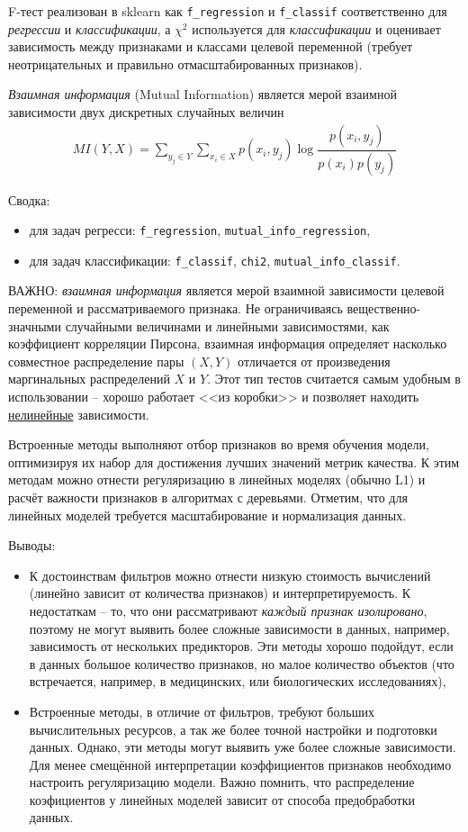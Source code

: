 \documentclass[%
	11pt,
	a4paper,
	utf8,
		]{article}
\begin{document}
F-тест реализован в sklearn как \texttt{f\_regression} и \texttt{f\_classif} соответственно для \emph{регрессии} и \emph{классификации}, а $ \chi^2 $ используется для \emph{классификации} и оценивает зависимость между признаками и классами целевой переменной (требует неотрицательных и правильно отмасштабированных признаков).

\emph{Взаимная информация} (Mutual Information) является мерой взаимной зависимости двух дискретных случайных величин
\begin{align*}
	MI(Y, X) = \sum_{y_j \in Y}\sum_{x_i \in X} p(x_i, y_j) \log \dfrac{p(x_i, y_j)}{p(x_i)p(y_j)}
\end{align*}

Сводка:
\begin{itemize}
	\item для задач регресси: \texttt{f\_regression}, \texttt{mutual\_info\_regression},
	
	\item для задач классификации: \texttt{f\_classif}, \texttt{chi2}, \texttt{mutual\_info\_classif}.
\end{itemize}

ВАЖНО: \emph{взаимная информация} является мерой взаимной зависимости целевой переменной и рассматриваемого признака. Не ограничиваясь вещественно-значными случайными величинами и линейными зависимостями, как коэффициент корреляции Пирсона, взаимная информация определяет насколько совместное распределение пары $ (X, Y) $ отличается от произведения маргинальных распределений $ X $ и $ Y $. Этот тип тестов считается самым удобным в использовании -- хорошо работает <<из коробки>> и позволяет находить \underline{нелинейные} зависимости.

Встроенные методы выполняют отбор признаков во время обучения модели, оптимизируя их набор для достижения лучших значений метрик качества. К этим методам можно отнести регуляризацию в линейных моделях (обычно L1) и расчёт важности признаков в алгоритмах с деревьями. Отметим, что для линейных моделей требуется масштабирование и нормализация данных.

Выводы:
\begin{itemize}
	\item К достоинствам фильтров можно отнести низкую стоимость вычислений (линейно зависит от количества признаков) и интерпретируемость. К недостаткам -- то, что они рассматривают \emph{каждый признак изолировано}, поэтому не могут выявить более сложные зависимости в данных, например, зависимость от нескольких предикторов. Эти методы хорошо подойдут, если в данных большое количество признаков, но малое количество объектов (что встречается, например, в медицинских, или биологических исследованиях),
	
	\item Встроенные методы, в отличие от фильтров, требуют больших вычислительных ресурсов, а так же более точной настройки и подготовки данных. Однако, эти методы могут выявить уже более сложные зависимости. Для менее смещённой интерпретации коэффициентов признаков необходимо настроить регуляризацию модели. Важно помнить, что распределение коэфициентов у линейных моделей зависит от способа предобработки данных.
\end{itemize}
\end{document}
